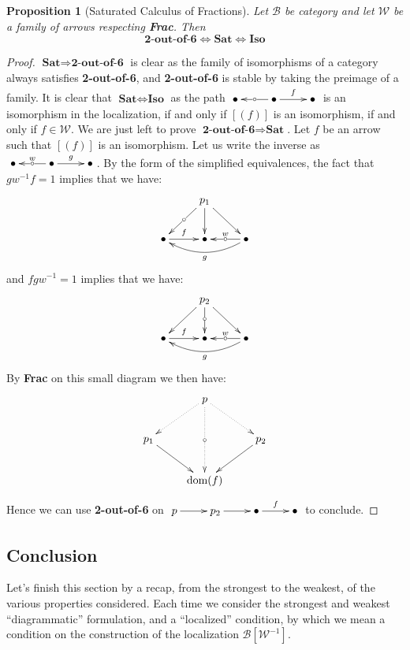 \documentclass{article}
\numberwithin{equation}{section}
\theoremstyle{definition}
\theoremstyle{plain}
\newtheorem{proposition}[equation]{Proposition}
\begin{document}
\begin{proposition}[Saturated Calculus of Fractions] Let $\mathcal{B}$ be category and let $\mathcal{W}$ be a family of arrows respecting \textbf{Frac}. Then
	\[\textbf{2-out-of-6} \Longleftrightarrow\textbf{Sat} \Longleftrightarrow \textbf{Iso}\]
\end{proposition}
\begin{proof}
	$\textbf{Sat}\Rightarrow\textbf{2-out-of-6}$ is clear as the family of isomorphisms of a category always satisfies \textbf{2-out-of-6}, and \textbf{2-out-of-6} is stable by taking the preimage of a family.
	It is clear that $\textbf{Sat}\Leftrightarrow\textbf{Iso}$ as the path $\xymatrix{\bullet & \bullet \ar[l]|{\circ}\ar[r]^f & \bullet}$ is an isomorphism in the localization, if and only if $[(f)]$ is an isomorphism, if and only if $f \in \mathcal{W}$. We are just left to prove $\textbf{2-out-of-6}\Rightarrow\textbf{Sat}$. Let $f$ be an arrow such that $[(f)]$ is an isomorphism. Let us write the inverse as $\xymatrix{\bullet & \bullet \ar[l]|{\circ}_w\ar[r]^g & \bullet}$. By the form of the simplified equivalences, the fact that $gw^{-1}f = 1$ implies that we have:
	\[\xymatrix{
		&p_1 \ar[dl]|{\circ} \ar[d] \ar[dr]\\
		\bullet \ar[r]^f & \bullet & \bullet \ar[l]|{\circ}_w\ar@/^1pc/[ll]^g
	}\]
	and $fgw^{-1} = 1$ implies that we have:
	\[\xymatrix{
		&p_2 \ar[dl] \ar[d]|{\circ} \ar[dr]\\
		\bullet \ar[r]^f & \bullet & \bullet \ar[l]|{\circ}_w\ar@/^1pc/[ll]^g
	}\]
	By \textbf{Frac} on this small diagram we then have:
	\[\xymatrix{
		&p \ar@{.>}[dl] \ar@{.>}[dr] \ar@{.>}[dd]|{\circ}\\
		p_1\ar[dr] && p_2 \ar[dl]\\
		& \textnormal{dom}(f)
	}\]
	Hence we can use \textbf{2-out-of-6} on $\xymatrix{p \ar[r] & p_2 \ar[r]& \bullet \ar[r]^f & \bullet}$ to conclude.
\end{proof}

\subsection{Conclusion}

Let's finish this section by a recap, from the strongest to the weakest, of the various properties considered. Each time we consider the strongest and weakest ``diagrammatic'' formulation, and a ``localized'' condition, by which we mean a condition on the construction of the localization $\mathcal{B}[\mathcal{W}^{-1}]$.
\end{document}
